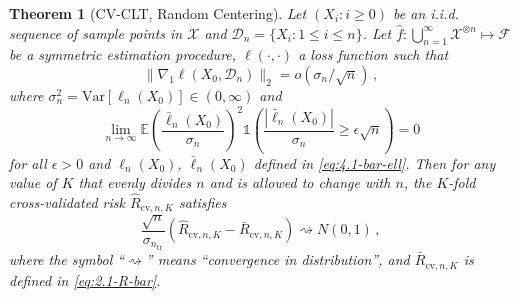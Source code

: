\documentclass[11pt]{article}
\theoremstyle{plain}
\newtheorem{theorem}{Theorem}[section]
\newcommand{\cv}{{\mathrm{cv}}}
\newcommand{\tr}{{\mathrm{tr}}}
\newcommand{\D}{{\mathcal{D}}}
\newcommand{\X}{{\mathcal{X}}}
\newcommand{\var}{\mathrm{Var}}
\begin{document}
\begin{theorem}[CV-CLT, Random Centering]\label{thm:4.1-clt-rand}
Let $(X_i:i\ge 0)$ be an i.i.d. sequence of sample points in $\X$ and $\D_n=\{X_i:1\le i\le n\}$.
Let $\hat f:\bigcup_{n=1}^\infty \X^{\otimes n}\mapsto \mathcal F$ be a symmetric estimation procedure, $\ell(\cdot,\cdot)$ a loss function such that
 \begin{equation}\label{eq:4.1-nabla-l2-bound}
 \|\nabla_1 \ell(X_0,\D_n)\|_2=o(\sigma_n/\sqrt{n})\,,
 \end{equation}
 where $\sigma_n^2=\var\left[\ell_n(X_0)\right]\in(0,\infty)$ and
 \begin{equation}
     \label{eq:4.1-lindeberg}
     \lim_{n\rightarrow\infty} \mathbb E\left(\frac{\bar\ell_n(X_0)}{\sigma_n}\right)^2\mathds{1}\left(\frac{|\bar\ell_n(X_0)|}{\sigma_n}\ge \epsilon\sqrt{n}\right)=0
 \end{equation}
 for all $\epsilon>0$ and $\ell_n(X_0)$, $\bar\ell_n(X_0)$ defined in \eqref{eq:4.1-bar-ell}.
Then for any value of $K$ that evenly divides $n$ and is allowed to change with $n$, the $K$-fold cross-validated risk $\hat R_{\cv,n,K}$ satisfies
$$
\frac{\sqrt{n}}{\sigma_{n_\tr}}\left(\hat R_{\cv,n,K}-\bar R_{\cv,n,K}\right)\rightsquigarrow N(0,1)\,,
$$
where the symbol ``$\rightsquigarrow$'' means ``convergence in distribution'', and $\bar R_{\cv,n,K}$ is defined in \eqref{eq:2.1-R-bar}.
\end{theorem}
\end{document}
